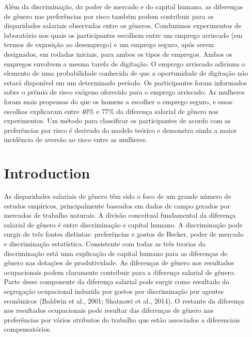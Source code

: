 \documentclass[a4paper,12pt]{article}[abntex2]
\begin{document}
Além da discriminação, do poder de mercado e do capital humano, as diferenças de gênero nas preferências por risco também podem contribuir para as disparidades salariais observadas entre os gêneros. Conduzimos experimentos de laboratório nos quais os participantes escolhem entre um emprego arriscado (em termos de exposição ao desemprego) e um emprego seguro, após serem designados, em rodadas iniciais, para ambos os tipos de empregos. Ambos os empregos envolvem a mesma tarefa de digitação. O emprego arriscado adiciona o elemento de uma probabilidade conhecida de que a oportunidade de digitação não estará disponível em um determinado período. Os participantes foram informados sobre o prêmio de risco exógeno oferecido para o emprego arriscado. As mulheres foram mais propensas do que os homens a escolher o emprego seguro, e essas escolhas explicaram entre 40\% e 77\% da diferença salarial de gênero nos experimentos. Um método para classificar os participantes de acordo com as preferências por risco é derivado do modelo teórico e demonstra ainda a maior incidência de aversão ao risco entre as mulheres.

\section{\textbf{Introduction}}

As disparidades salariais de gênero têm sido o foco de um grande número de estudos empíricos, principalmente baseados em dados de campo gerados por mercados de trabalho naturais. A divisão conceitual fundamental da diferença salarial de gênero é entre discriminação e capital humano. A discriminação pode surgir de três fontes distintas: preferências e gostos de Becker, poder de mercado e discriminação estatística. Consistente com todas as três teorias da discriminação está uma explicação de capital humano para as diferenças de gênero nas dotações de produtividade. As diferenças de gênero nos resultados ocupacionais podem claramente contribuir para a diferença salarial de gênero. Parte desse componente da diferença salarial pode surgir como resultado da segregação ocupacional induzida por gostos por discriminação por agentes econômicos (Baldwin et al., 2001; Shatnawi et al., 2014). O restante da diferença nos resultados ocupacionais pode resultar das diferenças de gênero nas preferências por vários atributos do trabalho que estão associados a diferenciais compensatórios.
\end{document}
